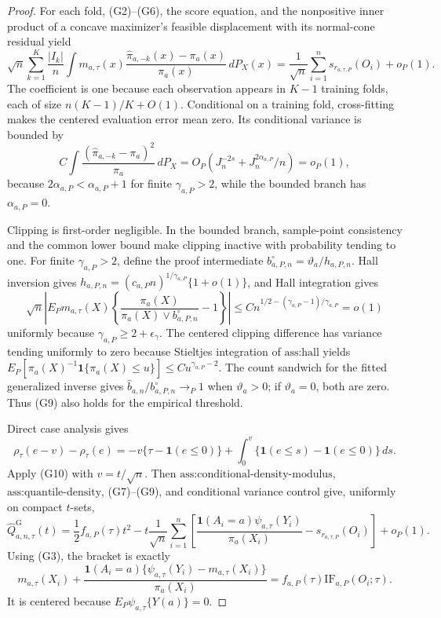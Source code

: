 \documentclass{article}
\begin{document}
\begin{proof}
For each fold, (G2)--(G6), the score equation, and the nonpositive inner product of a concave maximizer's feasible displacement with its normal-cone residual yield
\[
\sqrt n\sum_{k=1}^K\frac{|I_k|}{n}
\int m_{a,\tau}(x)
\frac{\widehat\pi_{a,-k}(x)-\pi_a(x)}{\pi_a(x)}\,dP_X(x)
=\frac1{\sqrt n}\sum_{i=1}^n s_{r_{a,\tau,P}}(O_i)+o_P(1).
\tag{G7}
\]
The coefficient is one because each observation appears in \(K-1\) training folds, each of size \(n(K-1)/K+O(1)\).  Conditional on a training fold, cross-fitting makes the centered evaluation error mean zero.  Its conditional variance is bounded by
\[
C\int\frac{(\widehat\pi_{a,-k}-\pi_a)^2}{\pi_a}\,dP_X
=O_P(J_n^{-2s}+J_n^{2\alpha_{a,P}}/n)=o_P(1),
\tag{G8}
\]
because \(2\alpha_{a,P}<\alpha_{a,P}+1\) for finite \(\gamma_{a,P}>2\), while the bounded branch has \(\alpha_{a,P}=0\).

Clipping is first-order negligible.  In the bounded branch, sample-point consistency and the common lower bound make clipping inactive with probability tending to one.  For finite \(\gamma_{a,P}>2\), define the proof intermediate \(b^\circ_{a,P,n}=\vartheta_a/h_{a,P,n}\).  Hall inversion gives \(h_{a,P,n}=(c_{a,P}n)^{1/\gamma_{a,P}}\{1+o(1)\}\), and Hall integration gives
\[
\sqrt n\left|E_Pm_{a,\tau}(X)
\left\{\frac{\pi_a(X)}{\pi_a(X)\vee b^\circ_{a,P,n}}-1\right\}\right|
\le Cn^{1/2-(\gamma_{a,P}-1)/\gamma_{a,P}}=o(1)
\tag{G9}
\]
uniformly because \(\gamma_{a,P}\ge2+\epsilon_\gamma\).  The centered clipping difference has variance tending uniformly to zero because Stieltjes integration of \(\text{ass:hall}\) yields
\(E_P[\pi_a(X)^{-1}\mathbf1\{\pi_a(X)\le u\}]\le Cu^{\gamma_{a,P}-2}\).  The count sandwich for the fitted generalized inverse gives \(\widehat b_{a,n}/b^\circ_{a,P,n}\to_P1\) when \(\vartheta_a>0\); if \(\vartheta_a=0\), both are zero.  Thus (G9) also holds for the empirical threshold.

Direct case analysis gives
\[
\rho_\tau(e-v)-\rho_\tau(e)
=-v\{\tau-\mathbf1(e\le0)\}
+\int_0^v\{\mathbf1(e\le s)-\mathbf1(e\le0)\}\,ds.
\tag{G10}
\]
Apply (G10) with \(v=t/\sqrt n\).  Then \(\text{ass:conditional-density-modulus}\), \(\text{ass:quantile-density}\), (G7)--(G9), and conditional variance control give, uniformly on compact \(t\)-sets,
\[
\widehat Q^{\mathrm G}_{a,n,\tau}(t)
=\frac12f_{a,P}(\tau)t^2-
t\frac1{\sqrt n}\sum_{i=1}^n
\left[
\frac{\mathbf1(A_i=a)\psi_{a,\tau}(Y_i)}{\pi_a(X_i)}
-s_{r_{a,\tau,P}}(O_i)
\right]+o_P(1).
\tag{G11}
\]
Using (G3), the bracket is exactly
\[
m_{a,\tau}(X_i)+\frac{\mathbf1(A_i=a)
\{\psi_{a,\tau}(Y_i)-m_{a,\tau}(X_i)\}}{\pi_a(X_i)}
=f_{a,P}(\tau)\mathrm{IF}_{a,P}(O_i;\tau).
\tag{G12}
\]
It is centered because \(E_P\psi_{a,\tau}\{Y(a)\}=0\).


\end{proof}
\end{document}
